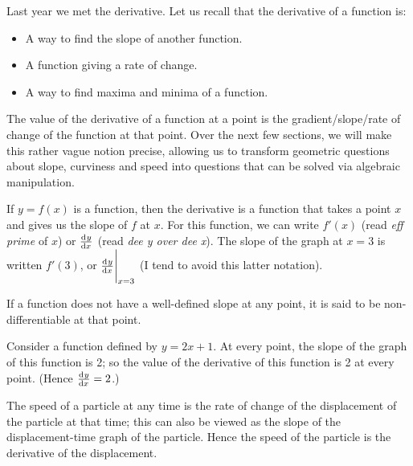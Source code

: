 




Last year we met the derivative. Let us recall that the derivative of a function is:
\begin{itemize}
  \item A way to find the slope of another function.
  \item A function giving a rate of change.
  \item A way to find maxima and minima of a function.
\end{itemize}
The value of the derivative of a function at a point is the gradient/slope/rate of change of the function at that
point. Over the next few sections, we will make this rather vague notion precise, allowing us to transform geometric questions
about slope, curviness and speed into questions that can be solved via algebraic manipulation.

If $ y = f(x) $ is a function, then the derivative is a function that takes a point $ x $ and gives us the slope of $ f $ at $ x $. For
this function, we can write $ f'(x) $ (read \emph{eff prime} of $ x $) or $ \od{y}{x} $ (read \emph{dee y over dee x}). The slope of the graph
at $ x = 3 $ is written $ f'(3) $, or $ \eval{\od{y}{x}}_{x = 3} $ (I tend to avoid this latter notation).

If a function does not have a well-defined slope at any point, it is said to be non-differentiable at that point.

\begin{ex}
  Consider a function defined by $ y = 2x + 1 $. At every point, the slope of the graph of this function is 2; so
  the value of the derivative of this function is 2 at every point. (Hence $ \od{y}{x} = 2 $.)
\end{ex}

\begin{ex}
  The speed of a particle at any time is the rate of change of the displacement of the particle at that time;
  this can also be viewed as the slope of the displacement-time graph of the particle. Hence the speed of the
  particle is the derivative of the displacement.
\end{ex}

